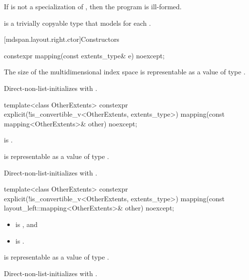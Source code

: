 \pnum
If  is not a specialization of ,
then the program is ill-formed.

\pnum
{} is a trivially copyable type
that models  for each .

[mdspan.layout.right.ctor]{Constructors}

%
\begin{itemdecl}
constexpr mapping(const extents_type& e) noexcept;
\end{itemdecl}

\begin{itemdescr}
\pnum
\expects
The size of the multidimensional index space  is representable as
a value of type .

\pnum
\effects
Direct-non-list-initializes  with .
\end{itemdescr}

%
\begin{itemdecl}
template<class OtherExtents>
  constexpr explicit(!is_convertible_v<OtherExtents, extents_type>)
    mapping(const mapping<OtherExtents>& other) noexcept;
\end{itemdecl}

\begin{itemdescr}
\pnum
\constraints
{} is .

\pnum
\expects
{} is representable as
a value of type .

\pnum
\effects
Direct-non-list-initializes  with .
\end{itemdescr}

%
\begin{itemdecl}
template<class OtherExtents>
  constexpr explicit(!is_convertible_v<OtherExtents, extents_type>)
    mapping(const layout_left::mapping<OtherExtents>& other) noexcept;
\end{itemdecl}

\begin{itemdescr}
\pnum
\constraints
\begin{itemize}
\item
{} is , and
\item
{} is .
\end{itemize}

\pnum
\expects
{} is representable as
a value of type .

\pnum
\effects
Direct-non-list-initializes  with .
\end{itemdescr}

